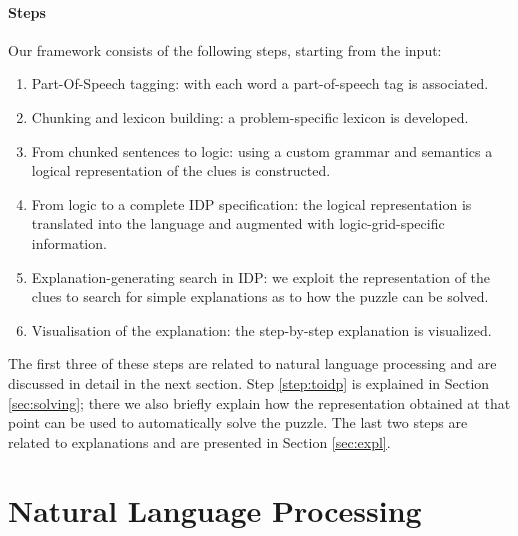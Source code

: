 \paragraph{Steps}
Our framework consists of the following steps, starting from the input:
\begin{enumerate}[A]
\item Part-Of-Speech tagging: with each word a part-of-speech tag is associated.
\item Chunking and lexicon building: a problem-specific lexicon is developed.
\item From chunked sentences to logic: using a custom grammar and semantics a logical representation of the clues is constructed.
 \item From logic to a complete IDP specification: the logical representation is translated into the \idp language and augmented with logic-grid-specific information. \label{step:toidp}
\item Explanation-generating search in IDP: we exploit the \idp representation of the clues to search for simple explanations as to how the puzzle can be solved.
\item Visualisation of the explanation: the step-by-step explanation is visualized.
\end{enumerate}
% 
% 

The first three of these steps are related to natural language processing and are discussed in detail in the next section. Step \ref{step:toidp} is explained in Section \ref{sec:solving}; there we also briefly explain how the representation obtained at that point can be used to automatically solve the puzzle. 
The last two steps are related to explanations and are presented in Section \ref{sec:expl}. 

\section{Natural Language Processing}\label{sec:nlp}

